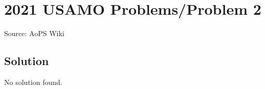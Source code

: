 \documentclass[12pt]{article}
\begin{document}
\section*{{2021 USAMO Problems/Problem 2}}
Source: AoPS Wiki

\subsection*{Solution}
No solution found.
\end{document}

